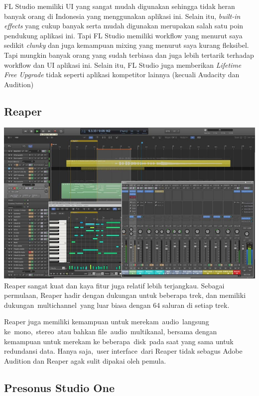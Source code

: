 \documentclass[12pt,a4paper]{report}
\begin{document}
  FL Studio memiliki UI yang sangat mudah digunakan sehingga tidak heran
  banyak orang di Indonesia yang menggunakan aplikasi ini. Selain itu,
  \emph{built-in effects} yang cukup banyak serta mudah digunakan
  merupakan salah satu poin pendukung aplikasi ini. Tapi FL Studio
  memiliki workflow yang menurut saya sedikit \emph{clunky} dan juga
  kemampuan mixing yang menurut saya kurang fleksibel. Tapi mungkin banyak
  orang yang sudah terbiasa dan juga lebih tertarik terhadap workflow dan
  UI aplikasi ini. Selain itu, FL Studio juga memberikan \emph{Lifetime
  Free Upgrade} tidak seperti aplikasi kompetitor lainnya (kecuali
  Audacity dan Audition)

  \subsection*{Reaper}\label{reaper}

  \includegraphics[width=\textwidth]{images/reaper.jpg} Reaper sangat kuat dan kaya fitur
  juga relatif lebih terjangkau. Sebagai permulaan, Reaper hadir dengan
  dukungan untuk beberapa trek, dan memiliki dukungan~multichannel~yang
  luar biasa dengan 64 saluran di setiap trek.

  Reaper juga memiliki kemampuan untuk merekam~audio~langsung
  ke~mono,~stereo~atau bahkan file~audio~multikanal, bersama dengan
  kemampuan untuk merekam ke beberapa~disk~pada saat yang sama untuk
  redundansi data. Hanya saja,~user interface~dari Reaper tidak sebagus
  Adobe Audition dan Reaper agak sulit dipakai oleh pemula.

  \subsection*{Presonus Studio One}\label{presonus-studio-one}
\end{document}
